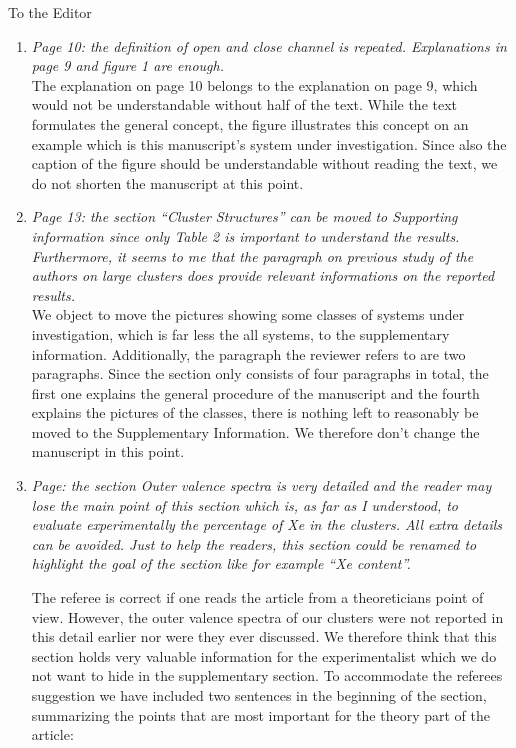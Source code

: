 \documentclass[DIN,pagenumber=false,parskip=half,fromalign=left,fromphone=true,fromemail=true,fromurl=false,fromlogo=false,fromrule=false]{scrlttr2}
\begin{document}
\begin{letter}{To the Editor}
\begin{enumerate}
\begin{enumerate}
   \item \emph{Page 10: the definition of open and close channel is repeated. Explanations in page 9 and figure 1 are enough.}\vspace{0.3cm}\\
         The explanation on page 10 belongs to the explanation on page 9, which
         would not be understandable without half of the text. While the
         text formulates the general concept, the figure illustrates this concept
         on an example which is this manuscript's system under investigation.
         Since also the caption of the figure should be understandable without
         reading the text, we do not shorten the manuscript at this point.

   \item \emph{Page 13:
         the section “Cluster Structures” can be moved to Supporting information since only Table 2 is important to understand the results. Furthermore, it seems to me that the paragraph on previous study of the authors on large clusters does provide relevant informations on the reported results.}\vspace{0.3cm}\\
         We object to move the pictures showing
         some classes of systems under investigation,
         which is far less the all systems, to the
         supplementary information. Additionally, the paragraph the reviewer
         refers to are two paragraphs. Since the section only consists of
         four paragraphs in total, the first one explains the general
         procedure of the manuscript and the fourth explains the pictures of
         the classes, there is nothing left to reasonably be moved to the
         Supplementary Information. We therefore don't change the manuscript
         in this point.

   \item \emph{Page:
         the section Outer valence spectra is very detailed and the reader may lose the main point of this section which is, as far as I understood, to evaluate experimentally the percentage of Xe in the clusters. All extra details can be avoided. Just to help the readers, this section could be renamed to highlight the goal of the section like for example “Xe content”.}
				
				The referee is correct if one reads the article from a theoreticians point of view. However, the outer valence spectra of our clusters were not reported in this detail earlier nor were they ever discussed. We therefore think that this section holds very valuable information for the experimentalist which we do not want to hide in the supplementary section. To accommodate the referees suggestion we have included two sentences in the beginning of the section, summarizing the points that are most important for the theory part of the article: \color{blue}{This section describes and discusses the outer valence spectra of the mixed Ar-Xe clusters. The main information we obtain from these spectra within the context of our theoretical considerations are the relative Xe contents in the mixed cluster.}
				

\end{enumerate}
\end{enumerate}
\end{letter}
\end{document}
